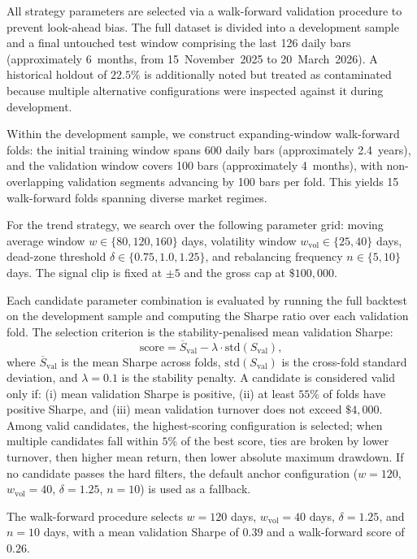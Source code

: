 \documentclass[11pt,a4paper]{article}
\begin{document}
All strategy parameters are selected via a walk-forward validation procedure to prevent look-ahead bias.  The full dataset is divided into a development sample and a final untouched test window comprising the last 126 daily bars (approximately 6~months, from 15~November~2025 to 20~March~2026).  A historical holdout of $22.5\%$ is additionally noted but treated as contaminated because multiple alternative configurations were inspected against it during development.

Within the development sample, we construct expanding-window walk-forward folds: the initial training window spans 600 daily bars (approximately 2.4~years), and the validation window covers 100 bars (approximately 4~months), with non-overlapping validation segments advancing by 100 bars per fold.  This yields 15 walk-forward folds spanning diverse market regimes.

For the trend strategy, we search over the following parameter grid: moving average window $w \in \{80, 120, 160\}$ days, volatility window $w_{\text{vol}} \in \{25, 40\}$ days, dead-zone threshold $\delta \in \{0.75, 1.0, 1.25\}$, and rebalancing frequency $n \in \{5, 10\}$ days.  The signal clip is fixed at $\pm 5$ and the gross cap at $\$100{,}000$.

Each candidate parameter combination is evaluated by running the full backtest on the development sample and computing the Sharpe ratio over each validation fold.  The selection criterion is the stability-penalised mean validation Sharpe:
\begin{equation}
  \text{score} = \overline{S}_{\text{val}} - \lambda \cdot \text{std}(S_{\text{val}}),
  \label{eq:wf-score}
\end{equation}
where $\overline{S}_{\text{val}}$ is the mean Sharpe across folds, $\text{std}(S_{\text{val}})$ is the cross-fold standard deviation, and $\lambda = 0.1$ is the stability penalty.  A candidate is considered valid only if: (i) mean validation Sharpe is positive, (ii) at least $55\%$ of folds have positive Sharpe, and (iii) mean validation turnover does not exceed $\$4{,}000$.  Among valid candidates, the highest-scoring configuration is selected; when multiple candidates fall within $5\%$ of the best score, ties are broken by lower turnover, then higher mean return, then lower absolute maximum drawdown.  If no candidate passes the hard filters, the default anchor configuration ($w = 120$, $w_{\text{vol}} = 40$, $\delta = 1.25$, $n = 10$) is used as a fallback.

The walk-forward procedure selects $w = 120$ days, $w_{\text{vol}} = 40$ days, $\delta = 1.25$, and $n = 10$ days, with a mean validation Sharpe of $0.39$ and a walk-forward score of $0.26$.
\end{document}
